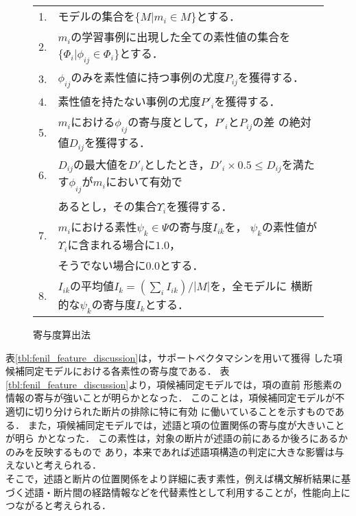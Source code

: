 \documentclass[japanese]{jnlp_1.2b}
\begin{document}
\begin{figure}[t]
 \begin{center}
  \begin{tabular}{rl}
   1. & モデルの集合を$\{M| m_{i} \in M\}$とする．\\
   2. & $m_{i}$の学習事例に出現した全ての素性値の集合を$\{\Phi_{i}|
   \phi_{ij} \in \Phi_{i}\}$とする．\\
   3. & $\phi_{ij}$のみを素性値に持つ事例の尤度$P_{ij}$を獲得する．\\
   4. & 素性値を持たない事例の尤度$P'_{i}$を獲得する．\\
   5. & $m_{i}$における$\phi_{ij}$の寄与度として，$P'_{i}$と$P_{ij}$の差
   の絶対値$D_{ij}$を獲得する．\\
   6. & $D_{ij}$の最大値を$D'_{i}$としたとき，$D'_{i} \times 0.5 \leq
   D_{ij}$を満たす$\phi_{ij}$が$m_{i}$において有効で\\
      & あるとし，その集合$\Upsilon_{i}$を獲得する．\\
   7. & $m_{i}$における素性$\psi_{k} \in \Psi$の寄与度$I_{ik}$を，
   $\psi_{k}$の素性値が$\Upsilon_{i}$に含まれる場合に$1.0$，\\
      & そうでない場合に$0.0$とする．\\
   8. & $I_{ik}$の平均値$I_{k} = (\sum_{i}{I_{ik}}) / |M|$を，全モデルに
   横断的な$\psi_{k}$の寄与度$I_{k}$とする．\\
  \end{tabular}
 \end{center}
 \caption{寄与度算出法}
 \label{fig:contalgo}
\end{figure}


表\ref{tbl:fenil_feature_discussion}は，サポートベクタマシンを用いて獲得
した項候補同定モデルにおける各素性の寄与度である．
表\ref{tbl:fenil_feature_discussion}より，項候補同定モデルでは，項の直前
形態素の情報の寄与が強いことが明らかとなった．
このことは，項候補同定モデルが不適切に切り分けられた断片の排除に特に有効
に働いていることを示すものである．
また，項候補同定モデルでは，述語と項の位置関係の寄与度が大きいことが明ら
かとなった．
この素性は，対象の断片が述語の前にあるか後ろにあるかのみを反映するもので
あり，本来であれば述語項構造の判定に大きな影響は与えないと考えられる．\\
そこで，述語と断片の位置関係をより詳細に表す素性，例えば構文解析結果に基
づく述語・断片間の経路情報などを代替素性として利用することが，性能向上に
つながると考えられる．
\end{document}
